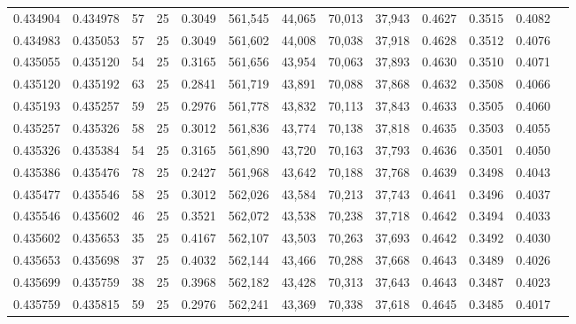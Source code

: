 \begin{tabular}{rrrrrrrrrrrrr}
0.434904 & 0.434978 &    57 &  25 &                                     0.3049 & 561,545 &  44,065 &  70,013 &  37,943 & 0.4627 & 0.3515 & 0.4082 \\
0.434983 & 0.435053 &    57 &  25 &                                     0.3049 & 561,602 &  44,008 &  70,038 &  37,918 & 0.4628 & 0.3512 & 0.4076 \\
0.435055 & 0.435120 &    54 &  25 &                                     0.3165 & 561,656 &  43,954 &  70,063 &  37,893 & 0.4630 & 0.3510 & 0.4071 \\
0.435120 & 0.435192 &    63 &  25 &                                     0.2841 & 561,719 &  43,891 &  70,088 &  37,868 & 0.4632 & 0.3508 & 0.4066 \\
0.435193 & 0.435257 &    59 &  25 &                                     0.2976 & 561,778 &  43,832 &  70,113 &  37,843 & 0.4633 & 0.3505 & 0.4060 \\
0.435257 & 0.435326 &    58 &  25 &                                     0.3012 & 561,836 &  43,774 &  70,138 &  37,818 & 0.4635 & 0.3503 & 0.4055 \\
0.435326 & 0.435384 &    54 &  25 &                                     0.3165 & 561,890 &  43,720 &  70,163 &  37,793 & 0.4636 & 0.3501 & 0.4050 \\
0.435386 & 0.435476 &    78 &  25 &                                     0.2427 & 561,968 &  43,642 &  70,188 &  37,768 & 0.4639 & 0.3498 & 0.4043 \\
0.435477 & 0.435546 &    58 &  25 &                                     0.3012 & 562,026 &  43,584 &  70,213 &  37,743 & 0.4641 & 0.3496 & 0.4037 \\
0.435546 & 0.435602 &    46 &  25 &                                     0.3521 & 562,072 &  43,538 &  70,238 &  37,718 & 0.4642 & 0.3494 & 0.4033 \\
0.435602 & 0.435653 &    35 &  25 &                                     0.4167 & 562,107 &  43,503 &  70,263 &  37,693 & 0.4642 & 0.3492 & 0.4030 \\
0.435653 & 0.435698 &    37 &  25 &                                     0.4032 & 562,144 &  43,466 &  70,288 &  37,668 & 0.4643 & 0.3489 & 0.4026 \\
0.435699 & 0.435759 &    38 &  25 &                                     0.3968 & 562,182 &  43,428 &  70,313 &  37,643 & 0.4643 & 0.3487 & 0.4023 \\
0.435759 & 0.435815 &    59 &  25 &                                     0.2976 & 562,241 &  43,369 &  70,338 &  37,618 & 0.4645 & 0.3485 & 0.4017 \\

\end{tabular}
